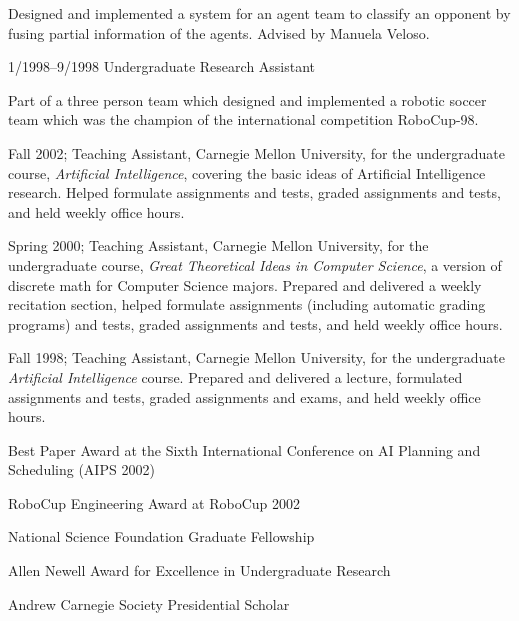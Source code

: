 \documentclass[ComputerScience]{vita}
\begin{document}
\begin{vita}
\begin{Research Experience}
    Designed and implemented a system for an agent team to classify
    an opponent by fusing partial information of the agents. Advised
    by Manuela Veloso.


   \item 1/1998--9/1998 Undergraduate Research Assistant

    Part of a three person team which designed and implemented a
    robotic soccer team which was the champion of the international
    competition RoboCup-98.

  \end{Research Experience}  

  
  \begin{Teaching Experience}
   \item Fall 2002; Teaching Assistant, Carnegie Mellon University,
    for the undergraduate course, \emph{Artificial Intelligence},
    covering the basic ideas of Artificial Intelligence research.
    Helped formulate assignments and tests, graded assignments and
    tests, and held weekly office hours.

   \item Spring 2000; Teaching Assistant, Carnegie Mellon University, for
    the undergraduate course, \emph{Great Theoretical Ideas in Computer
      Science}, a version of discrete math for Computer Science
    majors. Prepared and delivered a weekly recitation section, helped
    formulate assignments (including automatic grading programs) and
    tests, graded assignments and tests, and held weekly office hours.

   \item Fall 1998; Teaching Assistant, Carnegie Mellon University, for
    the undergraduate \emph{Artificial Intelligence}
    course. Prepared and delivered a lecture, formulated assignments and
    tests, graded assignments and exams, and held weekly office hours.
  \end{Teaching Experience}


  \begin{Honors}
   \item Best Paper Award at the Sixth International Conference on AI
    Planning and Scheduling (AIPS 2002)
   \item RoboCup Engineering Award at RoboCup 2002
   \item National Science Foundation Graduate Fellowship
   \item Allen Newell Award for Excellence in Undergraduate Research
   \item Andrew Carnegie Society Presidential Scholar
  \end{Honors}



\end{vita}
\end{document}
